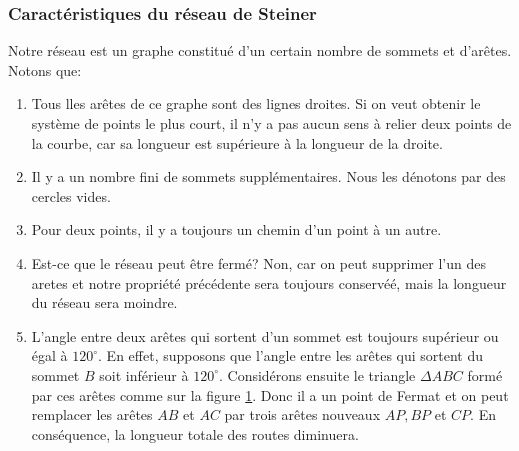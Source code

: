 \documentclass[10pt,a4paper]{article}%
\theoremstyle{theorem}
\theoremstyle{definition}
\begin{document}
			\subsubsection{Caractéristiques du réseau de Steiner}
			Notre réseau est un graphe constitué d'un certain nombre de sommets et d'arêtes. Notons que:
			
			\begin{enumerate}
				\item Tous lles arêtes de ce graphe sont des lignes droites. Si on veut obtenir le système de points le plus court, il n'y a pas aucun sens à relier deux points de la courbe, car sa longueur est supérieure à la longueur de la droite.
				
				\item Il y a  un nombre fini de sommets supplémentaires. Nous les dénotons par des cercles vides.
				
				\item Pour deux points, il y a toujours  un chemin d'un point à un autre.
				
				\item Est-ce que le réseau peut être fermé? Non, car on peut supprimer l'un des aretes et notre propriété précédente sera toujours conservéé, mais la longueur du réseau sera moindre.
				
				\item L'angle entre deux arêtes qui sortent d'un sommet est toujours supérieur ou égal à $120^\circ$. En effet, supposons que l'angle entre les arêtes qui sortent du sommet $B$ soit inférieur à $120^\circ$. Considérons ensuite le triangle $\Delta ABC$ formé par ces arêtes comme sur la figure \ref{prop5}. Donc il a un point de Fermat et on peut remplacer les arêtes $AB$ et $AC$ par trois arêtes nouveaux $AP,BP$ et $CP$. En conséquence, la longueur totale des routes diminuera. 
				\begin{figure}[h]
					\begin{center}
				\end{center}
				\caption{}\label{prop5}
				\end{figure}
			

\end{enumerate}
\end{document}
